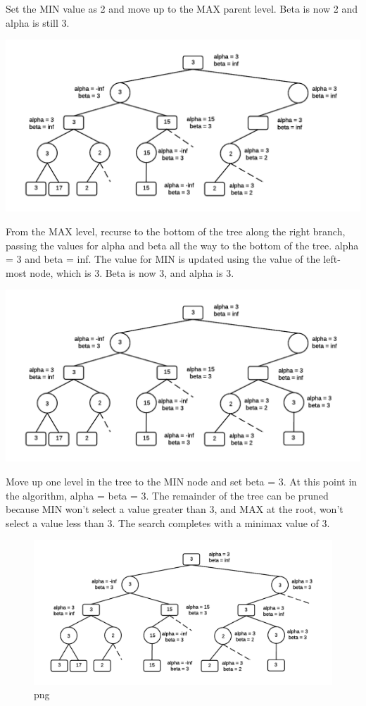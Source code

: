 \documentclass[11pt]{article}
\makeatletter
\def\maxwidth{\ifdim\Gin@nat@width>\linewidth\linewidth
    \else\Gin@nat@width\fi}
\let\Oldincludegraphics\includegraphics
\renewcommand{\includegraphics}[1]{\Oldincludegraphics[width=.8\maxwidth]{#1}}
\makeatother
\begin{document}
Set the MIN value as 2 and move up to the MAX parent level. Beta is now
2 and alpha is still 3.

\includegraphics{img/ABExample10.png}

From the MAX level, recurse to the bottom of the tree along the right
branch, passing the values for alpha and beta all the way to the bottom
of the tree. alpha = 3 and beta = inf. The value for MIN is updated
using the value of the left-most node, which is 3. Beta is now 3, and
alpha is 3.

\includegraphics{img/ABExample11.png}

Move up one level in the tree to the MIN node and set beta = 3. At this
point in the algorithm, alpha = beta = 3. The remainder of the tree can
be pruned because MIN won't select a value greater than 3, and MAX at
the root, won't select a value less than 3. The search completes with a
minimax value of 3.

\begin{figure}[htbp]
\centering
\includegraphics{img/ABExample12.png}
\caption{png}
\end{figure}
\end{document}
